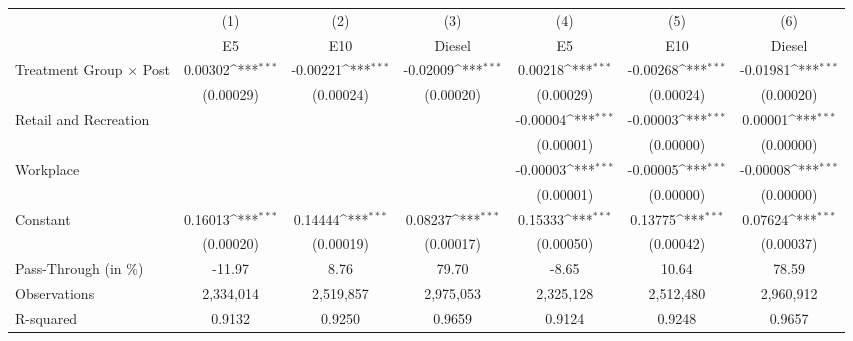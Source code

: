 {
\def\sym#1{\ifmmode^{#1}\else\(^{#1}\)\fi}
\begin{tabular}{l*{6}{c}}
\toprule
                    &\multicolumn{1}{c}{(1)}&\multicolumn{1}{c}{(2)}&\multicolumn{1}{c}{(3)}&\multicolumn{1}{c}{(4)}&\multicolumn{1}{c}{(5)}&\multicolumn{1}{c}{(6)}\\
                    &\multicolumn{1}{c}{E5}&\multicolumn{1}{c}{E10}&\multicolumn{1}{c}{Diesel}&\multicolumn{1}{c}{E5}&\multicolumn{1}{c}{E10}&\multicolumn{1}{c}{Diesel}\\
\midrule
Treatment Group $\times$ Post&     0.00302\sym{***}&    -0.00221\sym{***}&    -0.02009\sym{***}&     0.00218\sym{***}&    -0.00268\sym{***}&    -0.01981\sym{***}\\
                    &   (0.00029)         &   (0.00024)         &   (0.00020)         &   (0.00029)         &   (0.00024)         &   (0.00020)         \\
Retail and Recreation&                     &                     &                     &    -0.00004\sym{***}&    -0.00003\sym{***}&     0.00001\sym{***}\\
                    &                     &                     &                     &   (0.00001)         &   (0.00000)         &   (0.00000)         \\
Workplace           &                     &                     &                     &    -0.00003\sym{***}&    -0.00005\sym{***}&    -0.00008\sym{***}\\
                    &                     &                     &                     &   (0.00001)         &   (0.00000)         &   (0.00000)         \\
Constant            &     0.16013\sym{***}&     0.14444\sym{***}&     0.08237\sym{***}&     0.15333\sym{***}&     0.13775\sym{***}&     0.07624\sym{***}\\
                    &   (0.00020)         &   (0.00019)         &   (0.00017)         &   (0.00050)         &   (0.00042)         &   (0.00037)         \\
\midrule
Pass-Through (in \%)&      -11.97         &        8.76         &       79.70         &       -8.65         &       10.64         &       78.59         \\
Observations        &   2,334,014         &   2,519,857         &   2,975,053         &   2,325,128         &   2,512,480         &   2,960,912         \\
R-squared           &      0.9132         &      0.9250         &      0.9659         &      0.9124         &      0.9248         &      0.9657         \\
\bottomrule
\end{tabular}
}
